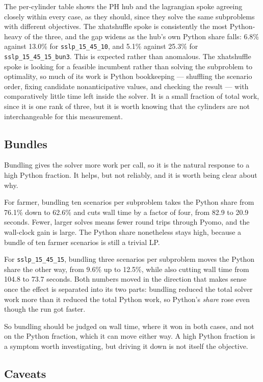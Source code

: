\documentclass{article}
\begin{document}
The per-cylinder table shows the PH hub and the lagrangian spoke
agreeing closely within every case, as they should, since they solve
the same subproblems with different objectives. The xhatshuffle spoke
is consistently the most Python-heavy of the three, and the gap widens
as the hub's own Python share falls: 6.8\% against 13.0\% for
\texttt{sslp\_15\_45\_10}, and 5.1\% against 25.3\% for
\texttt{sslp\_15\_45\_15\_bun3}. This is expected rather than
anomalous. The xhatshuffle spoke is looking for a feasible incumbent
rather than solving the subproblem to optimality, so much of its work
is Python bookkeeping --- shuffling the scenario order, fixing
candidate nonanticipative values, and checking the result --- with
comparatively little time left inside the solver. It is a small
fraction of total work, since it is one rank of three, but it is worth
knowing that the cylinders are not interchangeable for this
measurement.

\subsection{Bundles}

Bundling gives the solver more work per call, so it is the natural
response to a high Python fraction. It helps, but not reliably, and it
is worth being clear about why.

For farmer, bundling ten scenarios per subproblem takes the Python
share from 76.1\% down to 62.6\% and cuts wall time by a factor of
four, from 82.9 to 20.9 seconds. Fewer, larger solves means fewer
round trips through Pyomo, and the wall-clock gain is large. The Python
share nonetheless stays high, because a bundle of ten farmer scenarios
is still a trivial LP.

For \texttt{sslp\_15\_45\_15}, bundling three scenarios per subproblem
moves the Python share the other way, from 9.6\% up to 12.5\%, while
also cutting wall time from 104.8 to 73.7 seconds. Both numbers moved
in the direction that makes sense once the effect is separated into its
two parts: bundling reduced the total solver work more than it reduced
the total Python work, so Python's {\em share} rose even though the run
got faster.

So bundling should be judged on wall time, where it won in both cases,
and not on the Python fraction, which it can move either way. A high
Python fraction is a symptom worth investigating, but driving it down
is not itself the objective.

\subsection{Caveats}
\end{document}
